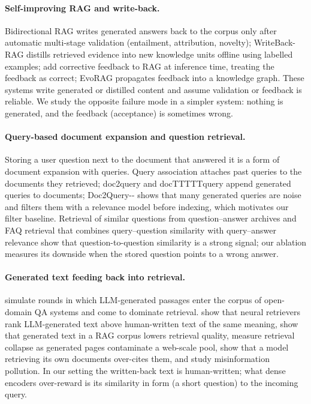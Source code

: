 \documentclass[11pt]{article}
\begin{document}
\paragraph{Self-improving RAG and write-back.} Bidirectional RAG \citep{chinthala2025bidirectional} writes generated answers back to the corpus only after automatic multi-stage validation (entailment, attribution, novelty); WriteBack-RAG \citep{lu2026writeback} distills retrieved evidence into new knowledge units offline using labelled examples; \citet{bang2026feedback} add corrective feedback to RAG at inference time, treating the feedback as correct; EvoRAG \citep{evorag2026} propagates feedback into a knowledge graph. These systems write generated or distilled content and assume validation or feedback is reliable. We study the opposite failure mode in a simpler system: nothing is generated, and the feedback (acceptance) is sometimes wrong.

\paragraph{Query-based document expansion and question retrieval.} Storing a user question next to the document that answered it is a form of document expansion with queries. Query association \citep{scholer2004query} attaches past queries to the documents they retrieved; doc2query and docTTTTTquery \citep{nogueira2019doc2query,nogueira2019doctttttquery} append generated queries to documents; Doc2Query-{}-{} \citep{gospodinov2023doc2queryminus} shows that many generated queries are noise and filters them with a relevance model before indexing, which motivates our filter baseline. Retrieval of similar questions from question--answer archives \citep{jeon2005finding} and FAQ retrieval that combines query--question similarity with query--answer relevance \citep{sakata2019faq} show that question-to-question similarity is a strong signal; our ablation measures its downside when the stored question points to a wrong answer.

\paragraph{Generated text feeding back into retrieval.} \citet{chen2024spiral} simulate rounds in which LLM-generated passages enter the corpus of open-domain QA systems and come to dominate retrieval. \citet{dai2024sourcebias} show that neural retrievers rank LLM-generated text above human-written text of the same meaning, \citet{llmtextharm2026} show that generated text in a RAG corpus lowers retrieval quality, \citet{yu2026collapse} measure retrieval collapse as generated pages contaminate a web-scale pool, \citet{druck2026ragcollapse} show that a model retrieving its own documents over-cites them, and \citet{pan2023misinfo} study misinformation pollution. In our setting the written-back text is human-written; what dense encoders over-reward is its similarity in form (a short question) to the incoming query.
\end{document}
